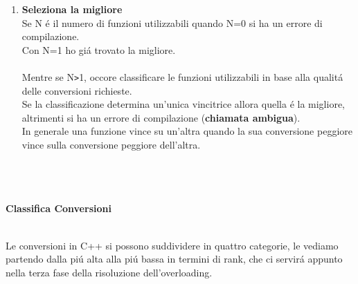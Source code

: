 \documentclass{article}
\begin{document}
\begin{enumerate}
\item \textbf{Seleziona la migliore}\\Se N \'e il numero di funzioni utilizzabili quando N=0 si ha un errore di compilazione. \\Con N=1 ho gi\'a trovato la migliore.\\ \\Mentre se N\texttt{>}1, occore classificare le funzioni utilizzabili in base alla qualit\'a delle conversioni richieste. \\Se la classificazione determina un'unica vincitrice allora quella \'e la migliore, altrimenti si ha un errore di compilazione (\textbf{chiamata ambigua}).\\In generale una funzione vince su un'altra quando la sua conversione peggiore vince sulla conversione peggiore dell'altra.
\\ \\ \\ \\ 
\end{enumerate}
\begin{large}\textbf{\textcolor{blu}{Classifica Conversioni}} \\ \\ \end{large}
Le conversioni in C++ si possono suddividere in quattro categorie, le vediamo partendo dalla pi\'u alta alla pi\'u bassa in termini di rank, che ci servir\'a appunto nella terza fase della risoluzione dell'overloading. \\
\end{document}
